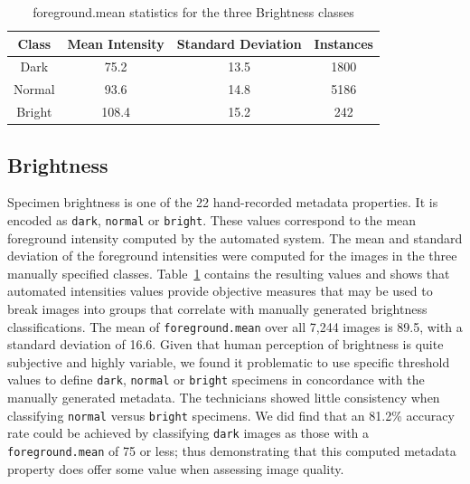 \documentclass[conference]{IEEEtran}
\begin{document}
\begin{table}[H]
    \centering
    \caption{foreground.mean statistics for the three Brightness classes}
    \label{tab:bright}
    \begin{tabular}{cccc}
        \toprule
        \textbf{Class} & \textbf{Mean Intensity} & \textbf{Standard Deviation} & \textbf{Instances}\\
        \midrule
        Dark & 75.2 & 13.5 & 1800\\
        Normal & 93.6 & 14.8 & 5186\\
        Bright & 108.4 & 15.2 & 242\\
        \bottomrule
    \end{tabular}
\end{table}
\subsection{Brightness}
Specimen brightness is one of the 22 hand-recorded metadata properties. It is encoded as \verb|dark|, \verb|normal| or \verb|bright|. These values
correspond to the mean foreground intensity computed by the automated system.
The mean and standard deviation of the foreground intensities were
computed for the images in the three manually specified classes.
Table~\ref{tab:bright} contains the resulting values and shows that
automated intensities values provide objective measures that may be used to break images into groups that correlate with manually generated
brightness classifications.
The mean of \verb|foreground.mean| over all 7,244 images is 89.5, with a
standard deviation of 16.6.
Given that human perception of brightness is quite subjective and
highly variable, we found it problematic to use specific threshold
values to define \verb|dark|, \verb|normal| or \verb|bright| specimens
in concordance with the manually generated metadata.  The technicians
showed little consistency when classifying \verb|normal| versus \verb|bright|
specimens. We did find that an 81.2\% accuracy rate could be achieved by
classifying \verb|dark| images as those with a \verb|foreground.mean| of 75
or less; thus demonstrating that this computed metadata property does 
offer some value when assessing image quality.
\end{document}
